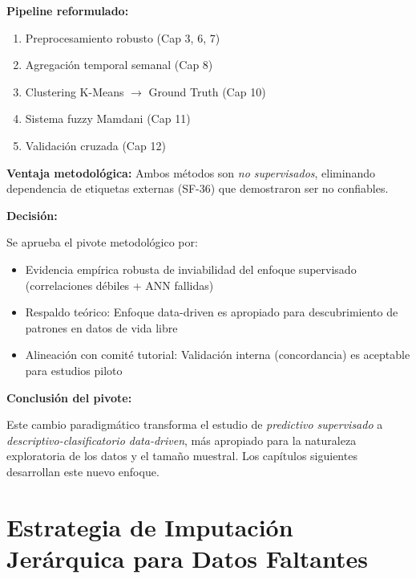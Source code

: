\documentclass[12pt,letterpaper,twoside]{report}
\begin{document}
\begin{calculobox}
\textbf{Pipeline reformulado:}

\begin{enumerate}[noitemsep]
    \item Preprocesamiento robusto (Cap 3, 6, 7)
    \item Agregación temporal semanal (Cap 8)
    \item Clustering K-Means $\to$ Ground Truth (Cap 10)
    \item Sistema fuzzy Mamdani (Cap 11)
    \item Validación cruzada (Cap 12)
\end{enumerate}

\textbf{Ventaja metodológica:} Ambos métodos son \textit{no supervisados}, eliminando dependencia de etiquetas externas (SF-36) que demostraron ser no confiables.
\end{calculobox}

\begin{decisionbox}
\textbf{Decisión:}

Se aprueba el pivote metodológico por:
\begin{itemize}[noitemsep]
    \item Evidencia empírica robusta de inviabilidad del enfoque supervisado (correlaciones débiles + ANN fallidas)
    \item Respaldo teórico: Enfoque data-driven es apropiado para descubrimiento de patrones en datos de vida libre
    \item Alineación con comité tutorial: Validación interna (concordancia) es aceptable para estudios piloto
\end{itemize}
\end{decisionbox}

\begin{conclusionbox}
\textbf{Conclusión del pivote:}

Este cambio paradigmático transforma el estudio de \textit{predictivo supervisado} a \textit{descriptivo-clasificatorio data-driven}, más apropiado para la naturaleza exploratoria de los datos y el tamaño muestral. Los capítulos siguientes desarrollan este nuevo enfoque.
\end{conclusionbox}

\chapter{Estrategia de Imputación Jerárquica para Datos Faltantes}
\end{document}
